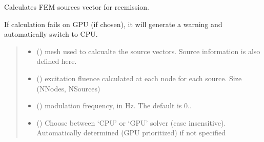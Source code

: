 \documentclass[letterpaper,10pt,english]{sphinxmanual}
\begin{document}
\begin{fulllineitems}
\label{\detokenize{_autosummary/nirfasterff.math.gen_sources_fl:nirfasterff.math.gen_sources_fl}}
\pysigstartsignatures
\pysiglinewithargsret
{}
{\sphinxparamcomma {}\sphinxparamcomma {}\sphinxparamcomma {}\sphinxparamcomma {}}
{}
\pysigstopsignatures
\sphinxAtStartPar
Calculates FEM sources vector for re\sphinxhyphen{}emission.

\sphinxAtStartPar
If calculation fails on GPU (if chosen), it will generate a warning and automatically switch to CPU.
\begin{quote}\begin{description}
\begin{itemize}
\item {} 
\sphinxAtStartPar
{} () \textendash{} mesh used to calcualte the source vectors. Source information is also defined here.

\item {} 
\sphinxAtStartPar
{} () \textendash{} excitation fluence calculated at each node for each source. Size (NNodes, NSources)

\item {} 
\sphinxAtStartPar
{} (\sphinxstyleliteralemphasis{\sphinxupquote{, }}) \textendash{} modulation frequency, in Hz. The default is 0..

\item {} 
\sphinxAtStartPar
{} (\sphinxstyleliteralemphasis{\sphinxupquote{, }}) \textendash{} Choose between ‘CPU’ or ‘GPU’ solver (case insensitive). Automatically determined (GPU prioritized) if not specified


\end{itemize}
\end{description}
\end{quote}
\end{fulllineitems}
\end{document}
